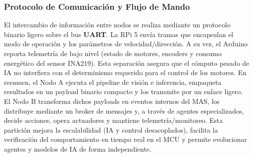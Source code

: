 \subsubsection{Protocolo de Comunicación y Flujo de Mando}
\label{subsubsec:protocolo_serial}
El intercambio de información entre nodos se realiza mediante un protocolo binario ligero sobre el bus \textbf{UART}. La RPi 5 envía tramas que encapsulan el modo de operación y los parámetros de velocidad/dirección. A su vez, el Arduino reporta telemetría de bajo nivel (estado de motores, encoders y consumo energético del sensor INA219). Esta separación asegura que el cómputo pesado de IA no interfiera con el determinismo requerido para el control de los motores.
En resumen, el Nodo A ejecuta el pipeline de visión e inferencia, empaqueta resultados en un payload binario compacto y los transmite por un enlace ligero. El Nodo B transforma dichos payloads en eventos internos del MAS, los distribuye mediante un broker de mensajes y, a través de agentes especializados, decide acciones, opera actuadores y mantiene telemetría/monitoreo. Esta partición mejora la escalabilidad (IA y control desacoplados), facilita la verificación del comportamiento en tiempo real en el MCU y permite evolucionar agentes y modelos de IA de forma independiente.
